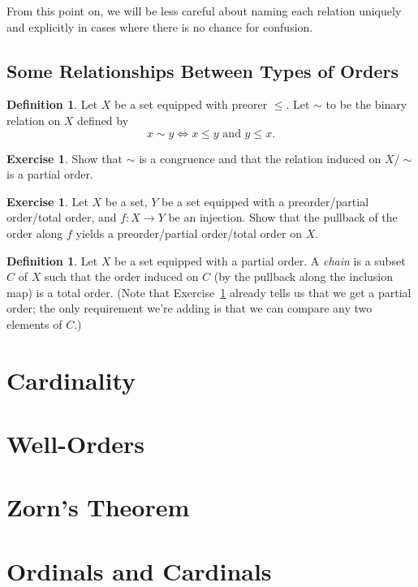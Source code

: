 \documentclass[letterpaper]{article}
\theoremstyle{definition}
\newtheorem{definition}[theorem]{Definition}
\newtheorem{exercise}[theorem]{Exercise}
\newcommand{\defterm}{\emph}
\begin{document}
From this point on, we will be less careful about naming each relation
uniquely and explicitly in cases where there is no chance for
confusion.

\subsection{Some Relationships Between Types of Orders}

\begin{definition}
  Let \(X\) be a set equipped with preorer \(\leq\).  Let \(\sim\) to
  be the binary relation on \(X\) defined by
  \[x \sim y \iff x \leq y \text{ and } y \leq x \text{.}\]
\end{definition}

\begin{exercise}
  Show that \(\sim\) is a congruence and that the relation induced on
  \(X/{\sim}\) is a partial order.
\end{exercise}

\begin{exercise}\label{exercise:pullback-order-injection}
  Let \(X\) be a set, \(Y\) be a set equipped with a preorder/partial
  order/total order, and \(f:X \to Y\) be an injection.  Show that the
  pullback of the order along \(f\) yields a preorder/partial
  order/total order on \(X\).
\end{exercise}

\begin{definition}
  Let \(X\) be a set equipped with a partial order.  A \defterm{chain}
  is a subset \(C\) of \(X\) such that the order induced on \(C\) (by
  the pullback along the inclusion map) is a total order.  (Note that
  Exercise~\ref{exercise:pullback-order-injection} already tells us
  that we get a partial order; the only requirement we're adding is
  that we can compare any two elements of \(C\).)
\end{definition}

\section{Cardinality}

\section{Well-Orders}

\section{Zorn's Theorem}

\section{Ordinals and Cardinals}
\end{document}

